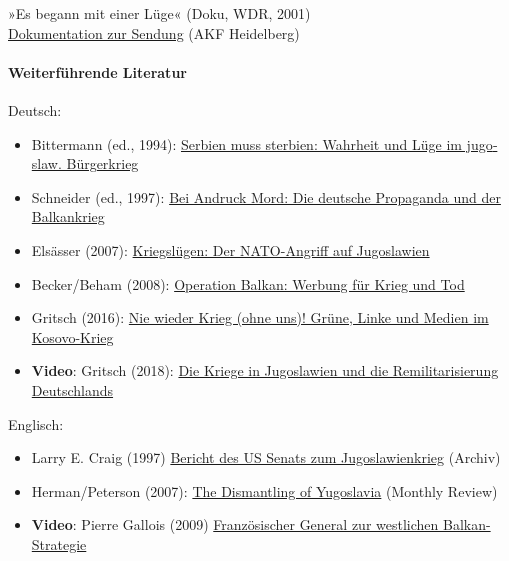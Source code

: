 »Es begann mit einer Lüge« (Doku, WDR, 2001)\\
\href{https://swprs.files.wordpress.com/2019/12/es_begann_mit_einer_luege_monitor_doku_mit_kritik.pdf}{Dokumentation
zur Sendung} (AKF Heidelberg)

\hypertarget{weiterfuxfchrende-literatur}{%
\paragraph{Weiterführende Literatur}\label{weiterfuxfchrende-literatur}}

Deutsch:

\begin{itemize}
\tightlist
\item
  Bittermann (ed., 1994):
  \href{https://edition-tiamat.de/serbien-muss-sterbien/}{Serbien muss
  sterbien: Wahrheit und Lüge im jugo­slaw. Bürger­krieg}
\item
  Schneider (ed., 1997):
  \href{https://www.amazon.de/Bei-Andruck-Mord-deutschen-Balkankrieg/dp/3930786095}{Bei
  Andruck Mord: Die deutsche Propaganda und der Balkankrieg}
\item
  Elsässer (2007):
  \href{https://www.amazon.de/Kriegsl\%C3\%BCgen-NATO-Angriff-Jugoslawien-J\%C3\%BCrgen-Els\%C3\%A4sser/dp/3897065118}{Kriegslügen:
  Der NATO-Angriff auf Jugoslawien}
\item
  Becker/Beham (2008):
  \href{https://www.amazon.de/Operation-Balkan-Werbung-Vorwort-Norman/dp/3832935916}{Operation
  Balkan: Werbung für Krieg und Tod}
\item
  Gritsch (2016):
  \href{https://www.heise.de/tp/buch/telepolis_buch_3186181.html}{Nie
  wieder Krieg (ohne uns)! Grüne, Linke und Medien im Kosovo-Krieg}
\item
  \textbf{Video}: Gritsch (2018):
  \href{https://www.youtube.com/watch?v=N-5yxP1Wyao}{Die Kriege in
  Jugoslawien und die Remilitarisierung Deutschlands}
\end{itemize}

Englisch:

\begin{itemize}
\tightlist
\item
  Larry E. Craig (1997)
  \href{https://web.archive.org/web/20110206110107/http://rpc.senate.gov/releases/1997/iran.htm}{Bericht
  des US Senats zum Jugoslawienkrieg} (Archiv)
\item
  Herman/Peterson (2007):
  \href{https://monthlyreview.org/2007/10/01/the-dismantling-of-yugoslavia/}{The
  Dismantling of Yugoslavia} (Monthly Review)
\item
  \textbf{Video}: Pierre Gallois (2009)
  \href{https://archive.org/details/french-general-pierre-marie-gallois-on-yugoslavia-war-2009}{Französischer
  General zur westlichen Balkan-Strategie}
\end{itemize}

